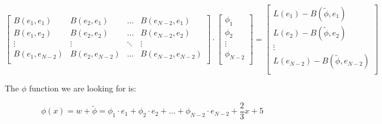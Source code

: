 \documentclass{article}
\begin{document}
\[
    \begin{bmatrix}
        B(e_1, e_1)         & B(e_2, e_1)       & \hdots    & B(e_{N-2}, e_1)       \\
        B(e_1, e_2)         & B(e_2, e_2)       & \hdots    & B(e_{N-2}, e_2)       \\
        \vdots              & \vdots            & \ddots    & \vdots                \\
        B(e_1, e_{N-2})     & B(e_2, e_{N-2})   & \hdots    & B(e_{N-2}, e_{N-2})   \\ 
    \end{bmatrix}
    \cdot
    \begin{bmatrix}
        \phi_1 \\
        \phi_2 \\
        \vdots \\
        \phi_{N-2} \\
    \end{bmatrix}
    =
    \begin{bmatrix}
        L(e_1) - B(\tilde{\phi}, e_1)           \\
        L(e_2) - B(\tilde{\phi}, e_2)           \\
        \vdots                                  \\
        L(e_{N-2}) - B(\tilde{\phi}, e_{N-2})   \\
    \end{bmatrix}
\]

The $\phi$ function we are looking for is:

\[\phi(x) = w + \tilde{\phi} = \phi_1 \cdot e_1 + \phi_2 \cdot e_2 + \hdots + \phi_{N-2} \cdot e_{N-2} + \frac{2}{3} x + 5 \]
\end{document}
